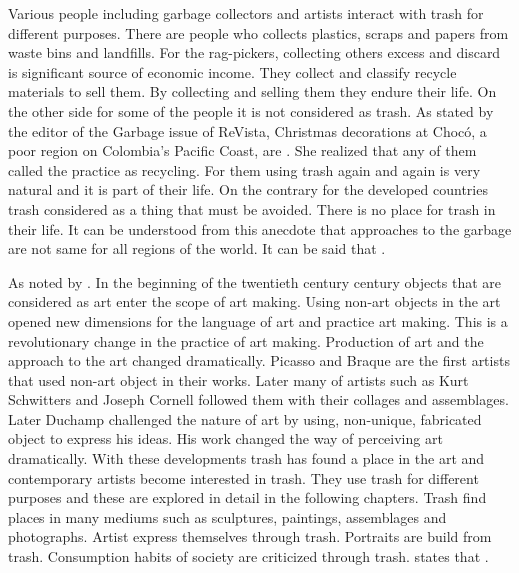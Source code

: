 Various people including garbage collectors and artists interact with trash for different purposes. There are people who collects plastics, scraps and papers from waste bins and landfills. For the rag-pickers, collecting others excess and discard is significant source of economic income. They collect and classify recycle materials to sell them. By collecting and selling them they endure their life. On the other side for some of the people it is not considered as trash. As stated by the editor of the Garbage issue of ReVista, Christmas decorations at Chocó, a poor region on Colombia’s Pacific Coast, are  \citep{erlick2015editorsletter}. She realized that any of them called the practice as recycling. For them using trash again and again is very natural and it is part of their life. On the contrary for the developed countries trash considered as a thing that must be avoided. There is no place for trash in their life. It can be understood from this anecdote that approaches to the garbage are not same for all regions of the world. It can be said that  \citep[xxvi]{zimring2012encyclopedia}.

As noted by \cite{pye2010trashculture} . In the beginning of the twentieth century century objects that are considered as art enter the scope of art making. Using non-art objects in the art opened new dimensions for the language of art and practice art making. This is a revolutionary change in the practice of art making. Production of art and the approach to the art changed dramatically. Picasso and Braque are the first artists that used non-art object in their works. Later many of artists such as Kurt Schwitters and Joseph Cornell followed them with their collages and assemblages. Later Duchamp challenged the nature of art by using, non-unique, fabricated object to express his ideas. His work changed the way of perceiving art dramatically. With these developments trash has found a place in the art and contemporary artists become interested in trash. They use trash for different purposes and these are explored in detail in the following chapters. Trash find places in many mediums such as sculptures, paintings, assemblages and photographs. Artist express themselves through trash. Portraits are build from trash. Consumption habits of society are criticized through trash. \citet[2]{pye2010trashculture} states that .



